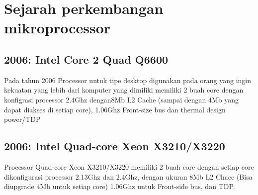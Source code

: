 \section{Sejarah perkembangan mikroprocessor}
\subsection{2006: Intel Core 2 Quad Q6600}
Pada tahun 2006 Processor untuk tipe desktop digunakan pada orang yang ingin kekuatan yang lebih dari komputer yang dimiliki memiliki 2 buah core dengan konfigrasi processor 2.4Ghz dengan8Mb L2 Cache (sampai dengan 4Mb yang dapat diakses di setiap core), 1.06Ghz Front-size bus dan thermal design power/TDP
\subsection{2006: Intel Quad-core Xeon X3210/X3220}
Processor Quad-core Xeon X3210/X3220 memiliki 2 buah core dengan setiap core dikonfigurasi processor 2.13Ghz dan 2.4Ghz, dengan ukuran 8Mb L2 Chace (Bisa diupgrade 4Mb untuk setiap core) 1.06Ghz untuk Front-side bus, dan TDP.